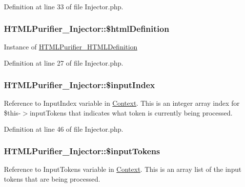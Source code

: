 Definition at line 33 of file Injector.\+php.

\hypertarget{classHTMLPurifier__Injector_abe98d61292bba4349be8a8236ef9e255}{
\subsubsection[{\$html\+Definition}]{\setlength{\rightskip}{0pt plus 5cm}H\+T\+M\+L\+Purifier\+\_\+\+Injector\+::\$html\+Definition\hspace{0.3cm}{\ttfamily [protected]}}}\label{classHTMLPurifier__Injector_abe98d61292bba4349be8a8236ef9e255}
Instance of \hyperlink{classHTMLPurifier__HTMLDefinition}{H\+T\+M\+L\+Purifier\+\_\+\+H\+T\+M\+L\+Definition} 

Definition at line 27 of file Injector.\+php.

\hypertarget{classHTMLPurifier__Injector_a9f43d4bd741ceaaca63bf47ff8fcf05e}{
\subsubsection[{\$input\+Index}]{\setlength{\rightskip}{0pt plus 5cm}H\+T\+M\+L\+Purifier\+\_\+\+Injector\+::\$input\+Index\hspace{0.3cm}{\ttfamily [protected]}}}\label{classHTMLPurifier__Injector_a9f43d4bd741ceaaca63bf47ff8fcf05e}
Reference to Input\+Index variable in \hyperlink{classContext}{Context}. This is an integer array index for \$this-\/$>$input\+Tokens that indicates what token is currently being processed. 

Definition at line 46 of file Injector.\+php.

\hypertarget{classHTMLPurifier__Injector_ada82e2e5701aad454e8b75b8aee6d606}{
\subsubsection[{\$input\+Tokens}]{\setlength{\rightskip}{0pt plus 5cm}H\+T\+M\+L\+Purifier\+\_\+\+Injector\+::\$input\+Tokens\hspace{0.3cm}{\ttfamily [protected]}}}\label{classHTMLPurifier__Injector_ada82e2e5701aad454e8b75b8aee6d606}
Reference to Input\+Tokens variable in \hyperlink{classContext}{Context}. This is an array list of the input tokens that are being processed. 

